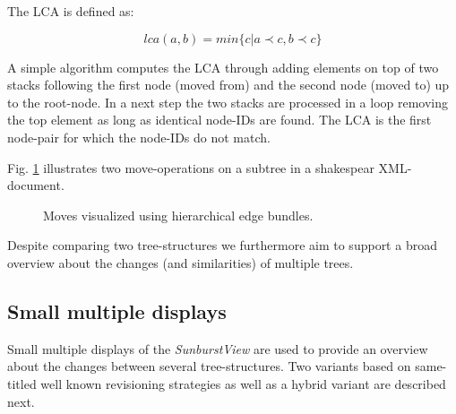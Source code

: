 The LCA is defined as:

\begin{equation}
lca(a{,} b) = min\{c|a \prec c, b \prec c\}
\end{equation}

A simple algorithm computes the LCA through adding elements on top of two stacks following the first node (moved from) and the second node (moved to) up to the root-node. In a next step the two stacks are processed in a loop removing the top element as long as identical node-IDs are found. The LCA is the first node-pair for which the node-IDs do not match.

Fig. \ref{fig:moves} illustrates two move-operations on a subtree in a shakespear XML-document.

\begin{figure}[tb]
\caption{\label{fig:moves} Moves visualized using hierarchical edge bundles.}
\end{figure}

Despite comparing two tree-structures we furthermore aim to support a broad overview about the changes (and similarities) of multiple trees.

\subsection{Small multiple displays}\label{subsec::smallmultiple}
Small multiple displays of the \emph{SunburstView} are used to provide an overview about the changes between several tree-structures. Two variants based on same-titled well known revisioning strategies as well as a hybrid variant are described next.

